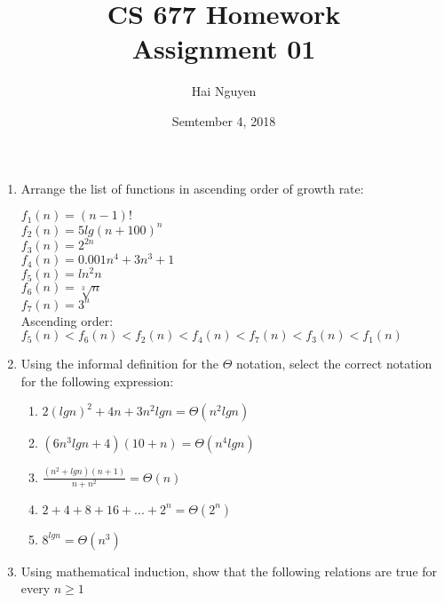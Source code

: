 \documentclass[[11pts]{report}
\title{CS 677 Homework \\ Assignment 01}
\date{Semtember 4, 2018}
\author{Hai Nguyen}
\begin{document}
\maketitle

\begin{enumerate}

\item Arrange the list of functions in ascending order of growth rate:

$f_1(n) = (n-1)!$
\\ $f_2(n) = 5lg(n + 100)^n$
\\ $f_3(n) = 2^{2n}$
\\ $f_4(n) = 0.001n^4 + 3n^3 + 1$
\\ $f_5(n) = ln^2n$ 
\\ $f_6(n) = \sqrt[3] {n}$
\\ $f_7(n) = 3^n$
\\ Ascending order:
$f_5(n) < f_6(n) < f_2(n) < f_4(n) < f_7(n) < f_3(n) < f_1(n)$ 

\item Using the informal definition for the $\Theta$ notation, select the correct notation for the following expression:

\begin{enumerate}

\item $2(lgn)^2 + 4n + 3n^2lgn = \Theta(n^2lgn)$

\item $(6n^3lgn + 4)(10+n) = \Theta(n^4lgn)$

\item $\frac{(n^2+lgn)(n+1)}{n+n^2} = \Theta(n)$

\item $ 2 + 4 + 8 + 16 + ... + 2^n = \Theta(2^n)$

\item $8^{lgn} = \Theta(n^3)$
\end{enumerate}

\item Using mathematical induction, show that the following relations are true for every $n \geq 1$

\begin{enumerate}


\end{enumerate}
\end{enumerate}
\end{document}
